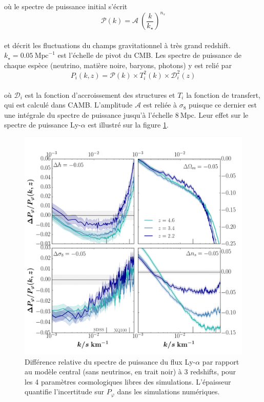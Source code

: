 où le spectre de puissance initial s'écrit \\
\begin{equation}
\mathcal{P} (k) = \mathcal{A}~\left( \frac{k}{k_\star}\right)^{n_s}
\end{equation} \\ et décrit les fluctuations du champs gravitationnel à très grand redshift. $k_\star = 0.05~\mathrm{Mpc}^{-1}$ est l'échelle de pivot du CMB. Les spectre de puissance de chaque espèce (neutrino, matière noire, baryons, photons) y est relié par \\
\begin{equation}
P_i (k,z) = \mathcal{P} (k) \times T^2_i (k) \times \mathcal{D}_i^2 (z)
\end{equation} \\ où $\mathcal{D}_i$ est la fonction d'accroissement des structures et $T_i$ la fonction de transfert, qui est calculé dans \textsf{CAMB}. L'amplitude $\mathcal{A}$ est reliée à $\sigma_8$ puisque ce dernier est une intégrale du spectre de puissance jusqu'à l'échelle $8~\mathrm{Mpc}$. Leur effet sur le spectre de puissance Ly-$\alpha$ est illustré sur la figure \ref{fig:cosmo}. \\

\begin{figure}
\begin{center}
\includegraphics[width=0.85\columnwidth]{Figures/Cosmo_Pf.png}
\caption{Différence relative du spectre de puissance du flux Ly-$\alpha$ par rapport au modèle central (sans neutrinos, en trait noir) à 3 redshifts, pour les 4 paramètres cosmologiques libres des simulations. L'épaisseur quantifie l'incertitude sur $P_\varphi$ dans les simulations numériques.}
\label{fig:cosmo}
\end{center}
\end{figure}

